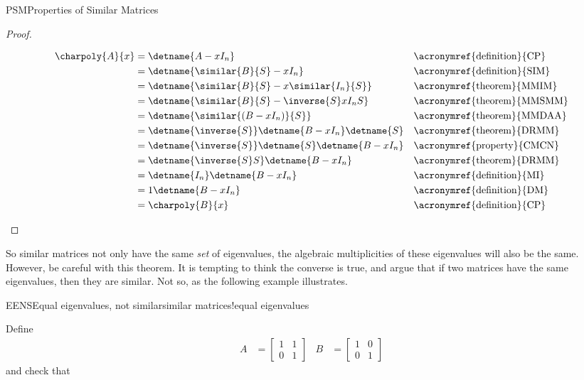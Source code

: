 \begin{subsect}{PSM}{Properties of Similar Matrices}
\begin{proof}
\begin{para}
%
\begin{align*}
\charpoly{A}{x}&=\detname{A-xI_n}&&\text{\acronymref{definition}{CP}}\\
&=\detname{\similar{B}{S}-xI_n}&&\text{\acronymref{definition}{SIM}}\\
&=\detname{\similar{B}{S}-x\similar{I_n}{S}}&&\text{\acronymref{theorem}{MMIM}}\\
&=\detname{\similar{B}{S}-\inverse{S}xI_nS}&&\text{\acronymref{theorem}{MMSMM}}\\
&=\detname{\similar{\left(B-xI_n\right)}{S}}&&\text{\acronymref{theorem}{MMDAA}}\\
&=\detname{\inverse{S}}\detname{B-xI_n}\detname{S}&&\text{\acronymref{theorem}{DRMM}}\\
&=\detname{\inverse{S}}\detname{S}\detname{B-xI_n}&&\text{\acronymref{property}{CMCN}}\\
&=\detname{\inverse{S}S}\detname{B-xI_n}&&\text{\acronymref{theorem}{DRMM}}\\
&=\detname{I_n}\detname{B-xI_n}&&\text{\acronymref{definition}{MI}}\\
&=1\detname{B-xI_n}&&\text{\acronymref{definition}{DM}}\\
&=\charpoly{B}{x}&&\text{\acronymref{definition}{CP}}
\end{align*}
\end{para}
%
\end{proof}
%
\begin{para}So similar matrices not only have the same {\em set} of eigenvalues, the algebraic multiplicities of these eigenvalues will also be the same.  However, be careful with this theorem.  It is tempting to think the converse is true, and argue that if two matrices have the same eigenvalues, then they are similar.  Not so, as the following example illustrates.\end{para}
%
\begin{example}{EENS}{Equal eigenvalues, not similar}{similar matrices!equal eigenvalues}
\begin{para}Define
%
\begin{align*}
A&=\begin{bmatrix}1&1\\0&1\end{bmatrix}
&
B&=\begin{bmatrix}1&0\\0&1\end{bmatrix}
\end{align*}
%
and check that
%
\begin{equation*}

\end{equation*}
\end{para}
\end{example}
\end{subsect}
